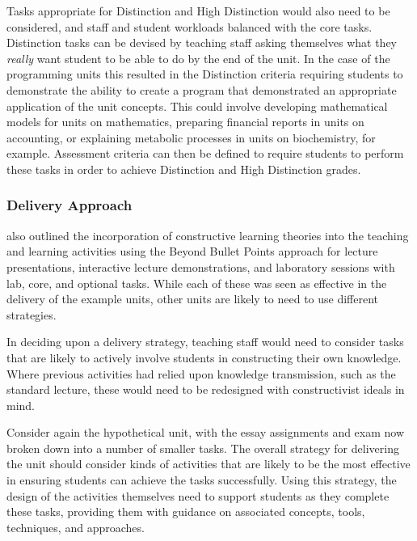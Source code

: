 Tasks appropriate for Distinction and High Distinction would also need to be considered, and staff and student workloads balanced with the core tasks. Distinction tasks can be devised by teaching staff asking themselves what they \emph{really} want student to be able to do by the end of the unit. In the case of the programming units this resulted in the Distinction criteria requiring students to demonstrate the ability to create a program that demonstrated an appropriate application of the unit concepts. This could involve developing mathematical models for units on mathematics, preparing financial reports in units on accounting, or explaining metabolic processes in units on biochemistry, for example. Assessment criteria can then be defined to require students to perform these tasks in order to achieve Distinction and High Distinction grades.



\subsubsection{Delivery Approach} %
\label{ssub:delivery_approach}

 also outlined the incorporation of constructive learning theories into the teaching and learning activities using the Beyond Bullet Points approach for lecture presentations, interactive lecture demonstrations, and laboratory sessions with lab, core, and  optional tasks. While each of these was seen as effective in the delivery of the example units, other units are likely to need to use different strategies. 

In deciding upon a delivery strategy, teaching staff would need to consider tasks that are likely to actively involve students in constructing their own knowledge. Where previous activities had relied upon knowledge transmission, such as the standard lecture, these would need to be redesigned with constructivist ideals in mind.

Consider again the hypothetical unit, with the essay assignments and exam now broken down into a number of smaller tasks. The overall strategy for delivering the unit should consider kinds of activities that are likely to be the most effective in ensuring students can achieve the tasks successfully. Using this strategy, the design of the activities themselves need to support students as they complete these tasks, providing them with guidance on associated concepts, tools, techniques, and approaches.

